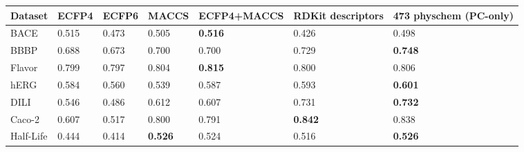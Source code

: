 \begin{tabular}{lllllll}
\toprule
Dataset & ECFP4 & ECFP6 & MACCS & ECFP4+MACCS & RDKit descriptors & 473 physchem (PC-only) \\
\midrule
BACE & 0.515 & 0.473 & 0.505 & \textbf{0.516} & 0.426 & 0.498 \\
BBBP & 0.688 & 0.673 & 0.700 & 0.700 & 0.729 & \textbf{0.748} \\
Flavor & 0.799 & 0.797 & 0.804 & \textbf{0.815} & 0.800 & 0.806 \\
hERG & 0.584 & 0.560 & 0.539 & 0.587 & 0.593 & \textbf{0.601} \\
DILI & 0.546 & 0.486 & 0.612 & 0.607 & 0.731 & \textbf{0.732} \\
Caco-2 & 0.607 & 0.517 & 0.800 & 0.791 & \textbf{0.842} & 0.838 \\
Half-Life & 0.444 & 0.414 & \textbf{0.526} & 0.524 & 0.516 & \textbf{0.526} \\
\bottomrule
\end{tabular}
